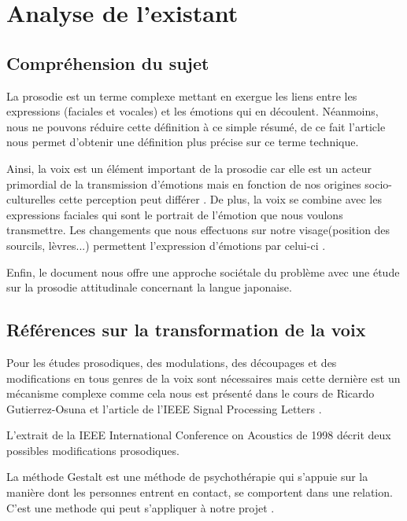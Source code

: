 \chapter{Analyse de l'existant}

\section{Compréhension du sujet}\label{comprehension_sujet}

La prosodie est un terme complexe mettant en exergue les liens entre les expressions (faciales et vocales) et les émotions qui en découlent. Néanmoins, nous ne pouvons réduire cette définition à ce simple résumé, de ce fait l'article \cite{bachorowski1999vocal} nous permet d'obtenir une définition plus précise sur ce terme technique.

Ainsi, la voix est un élément important de la prosodie car elle est un acteur primordial de la transmission d'émotions mais en fonction de nos origines socio-culturelles cette perception peut différer \cite{auberge2002prosodie}.
De plus, la voix se combine avec les expressions faciales qui sont le portrait de l'émotion que nous voulons transmettre. Les changements que nous effectuons sur notre visage(position des sourcils, lèvres...) permettent l'expression d'émotions par celui-ci \cite{ekman2003unmasking} .

Enfin, le document \cite{fourer:hal-00992083} nous offre une approche sociétale du problème avec une étude sur la prosodie attitudinale concernant la langue japonaise.


\section{Références sur la transformation de la voix}\label{ref_transfo_voix}

Pour les études prosodiques, des modulations, des découpages et des modifications en tous genres de la voix sont nécessaires mais cette dernière est un mécanisme complexe comme cela nous est présenté dans le cours de Ricardo Gutierrez-Osuna \cite{Gutierrez-Osuna:ISP-PMS} et l'article de l'IEEE Signal Processing Letters \cite{haagen1994transformation}.

L'extrait de la IEEE International Conference on Acoustics de 1998 \cite{Acero:ICASSP98-II-881} décrit deux possibles modifications prosodiques.

La méthode Gestalt est une méthode de psychothérapie qui s'appuie sur la manière dont les personnes entrent en contact, se comportent dans une relation. C'est une methode qui peut s'appliquer à notre projet \cite{auberge2002gestalt}.

